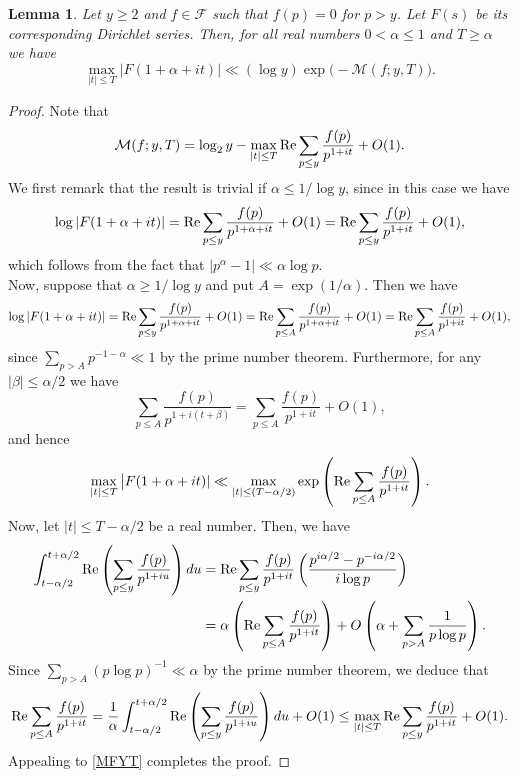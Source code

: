 \documentclass[12pt]{amsart}
\newtheorem{lem}[thm]{Lemma}
\theoremstyle{definition}
\numberwithin{equation}{section}
\newcommand{\re}{\textup{Re}}
\begin{document}
\begin{lem}\label{MaxFDistance}
Let $y\geq 2$ and $f \in \mathcal{F}$ such that $f(p)=0$ for $p>y$. Let $F(s)$ be its corresponding Dirichlet series.  Then, for all real numbers $0< \alpha\leq 1$ and $T\geq \alpha$ we have 
$$
\max_{|t|\leq T} \big|F(1+\alpha+it)|\ll (\log y)\exp\big(-\mathcal{M}(f; y, T)\big).
$$
\end{lem}
\begin{proof} Note that
\begin{equation}\label{MFYT}
\mathcal{M}(f; y, T)= \log_2 y- \max_{|t|\leq T} \re \sum_{p\leq y} \frac{f(p)}{p^{1+it}}+O(1).
\end{equation}
We first remark that the result is trivial if $\alpha\leq 1/\log y$, since in this case we have 
$$
\log |F(1+\alpha+it)|= \re \sum_{p\leq y} \frac{f(p)}{p^{1+\alpha+it}}+O(1)= \re \sum_{p\leq y} \frac{f(p)}{p^{1+it}}+O(1),
$$
which follows from the fact that $|p^{\alpha}-1|\ll \alpha\log p$.\\
Now, suppose that $\alpha\geq 1/\log y$ and put $A=\exp(1/\alpha)$. Then we have
$$ \log |F(1+\alpha+it)| =\re \sum_{p\leq y} \frac{f(p)}{p^{1+\alpha+it}}+O(1)= \re \sum_{p\leq A} \frac{f(p)}{p^{1+\alpha+it}}+O(1)=\re \sum_{p\leq A} \frac{f(p)}{p^{1+it}}+O(1),$$
since  $\sum_{p>A} p^{-1-\alpha}\ll 1$ by the prime number theorem. Furthermore, for any $|\beta|\leq \alpha/2$ we have 
$$\sum_{p\leq A} \frac{f(p)}{p^{1+i(t+\beta)}}=\sum_{p\leq A} \frac{f(p)}{p^{1+it}}+O(1),$$
and hence
$$ \max_{|t|\leq T} \big|F(1+\alpha+it)|\ll \max_{|t|\leq (T-\alpha/2)} \exp\left(\re\sum_{p\leq A} \frac{f(p)}{p^{1+it}}\right).
$$
Now, let $|t|\leq T-\alpha/2$ be a real number. Then, we have
\begin{align*}
\int_{t-\alpha/2}^{t+\alpha/2}  \re\left(\sum_{p\leq y} \frac{f(p)}{p^{1+iu}}\right) du
&= \re \sum_{p\leq y}\frac{f(p)}{p^{1+it}}\left(\frac{p^{i\alpha/2}-p^{-i\alpha/2}}{i\log p}\right)\\
&=\alpha \left(\re\sum_{p\leq A} \frac{f(p)}{p^{1+it}}\right) + O\left(\alpha + \sum_{p>A} \frac{1}{p\log p}\right).
\end{align*}
Since $\sum_{p>A} (p\log p)^{-1}\ll \alpha$ by the prime number theorem, we deduce that
$$\re\sum_{p\leq A}\frac{f(p)}{p^{1+it}}=\frac{1}{\alpha} \int_{t-\alpha/2}^{t+\alpha/2} \re\left(\sum_{p\leq y} \frac{f(p)}{p^{1+iu}}\right) du +O(1)\leq \max_{|t|\leq T} \re \sum_{p\leq y} \frac{f(p)}{p^{1+it}}+O(1).$$
Appealing to \eqref{MFYT} completes the proof.
\end{proof}
\end{document}
